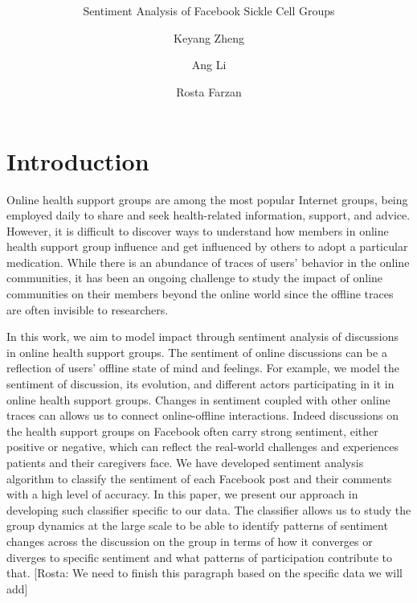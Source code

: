 \documentclass{llncs}
\newcommand{\rosta}[1]{\textcolor{BlueGreen}{[Rosta: #1]}}
\begin{document}
\title{ }
\subtitle{Sentiment Analysis of Facebook Sickle Cell Groups}

\author{Keyang Zheng \and Ang Li \and Rosta Farzan}

\maketitle

\begin{abstract}

\end{abstract}

\section{Introduction}

Online health support groups are among the most popular Internet groups, being employed daily to share and seek health-related information, support, and advice. However, it is difficult to discover ways to understand how members in online health support group influence and get influenced by others to adopt a particular medication. While there is an abundance of traces of users' behavior in the online communities, it has been an ongoing challenge to study the impact of online communities on their members beyond the online world since the offline traces are often invisible to researchers. 

In this work, we aim to model impact through sentiment analysis of discussions in online health support groups. The sentiment of online discussions can be a reflection of users' offline state of mind and feelings.  For example, we model the sentiment of discussion, its evolution, and different actors participating in it in online health support groups. Changes in sentiment coupled with other online traces can allows us to connect online-offline interactions. Indeed discussions on the health support groups on Facebook often carry strong sentiment, either positive or negative, which can reflect the real-world challenges and experiences patients and their caregivers face.  We have developed sentiment analysis algorithm to classify the sentiment of each Facebook post and their comments with a high level of accuracy. In this paper, we present our approach in developing such classifier specific to our data.  The classifier allows us to study the group dynamics at the large scale to be able to identify patterns of sentiment changes across the discussion on the group in terms of how it converges or diverges to specific sentiment and what patterns of participation contribute to that.  \rosta{We need to finish this paragraph based on the specific data we will add}
\end{document}

